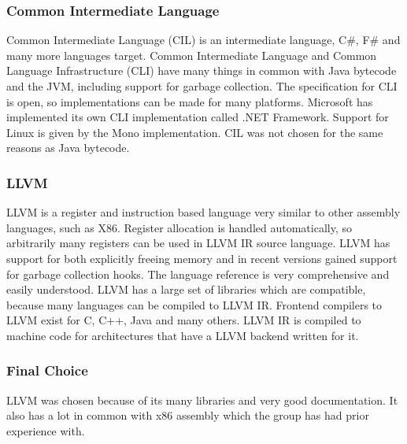 \subsubsection{Common Intermediate Language}
Common Intermediate Language (CIL) is an intermediate language, C\#, F\# and many more languages target. Common Intermediate Language and Common Language Infrastructure (CLI) have many things in common with Java bytecode and the JVM, including support for garbage collection. The specification for CLI is open, so implementations can be made for many platforms. Microsoft has implemented its own CLI implementation called .NET Framework. Support for Linux is given by the Mono implementation. CIL was not chosen for the same reasons as Java bytecode.

\subsubsection{LLVM}
LLVM is a register and instruction based language very similar to other assembly languages, such as X86. Register allocation is handled automatically, so arbitrarily many registers can be used in LLVM IR source language. LLVM has support for both explicitly freeing memory and in recent versions gained support for garbage collection hooks. The language reference is very comprehensive and easily understood. LLVM has a large set of libraries which are compatible, because many languages can be compiled to LLVM IR. Frontend compilers to LLVM exist for C, C++, Java and many others. LLVM IR is compiled to machine code for architectures that have a LLVM backend written for it.

\subsubsection{Final Choice}
LLVM was chosen because of its many libraries and very good documentation. It also has a lot in common with x86 assembly which the group has had prior experience with.
